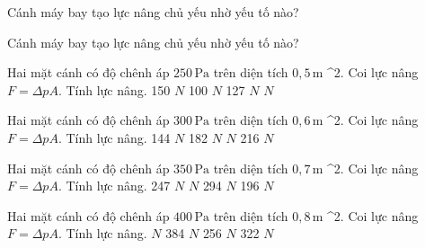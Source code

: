 \begin{bt}
Cánh máy bay tạo lực nâng chủ yếu nhờ yếu tố nào?
\end{bt}

\begin{bt}
Cánh máy bay tạo lực nâng chủ yếu nhờ yếu tố nào?
\end{bt}

\begin{ex}
Hai mặt cánh có độ chênh áp $250\,\text{Pa}$ trên diện tích $0,5\,\text{m}$ ^2. Coi lực nâng $F=\Delta pA$. Tính lực nâng.
\choice
{150 $N$}
{100 $N$}
{127 $N$}
{ $N$}
\end{ex}

\begin{ex}
Hai mặt cánh có độ chênh áp $300\,\text{Pa}$ trên diện tích $0,6\,\text{m}$ ^2. Coi lực nâng $F=\Delta pA$. Tính lực nâng.
\choice
{144 $N$}
{182 $N$}
{ $N$}
{216 $N$}
\end{ex}

\begin{ex}
Hai mặt cánh có độ chênh áp $350\,\text{Pa}$ trên diện tích $0,7\,\text{m}$ ^2. Coi lực nâng $F=\Delta pA$. Tính lực nâng.
\choice
{247 $N$}
{ $N$}
{294 $N$}
{196 $N$}
\end{ex}

\begin{ex}
Hai mặt cánh có độ chênh áp $400\,\text{Pa}$ trên diện tích $0,8\,\text{m}$ ^2. Coi lực nâng $F=\Delta pA$. Tính lực nâng.
\choice
{ $N$}
{384 $N$}
{256 $N$}
{322 $N$}
\end{ex}

